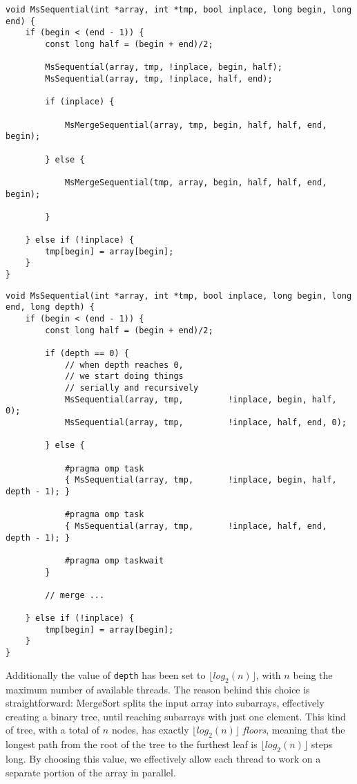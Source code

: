 \documentclass[11pt,a4paper,oneside]{book}
\begin{document}
	\begin{minipage}[t]{0.45\textwidth}
		\begin{lstlisting}[caption={Original version of MergeSort.},label=mergesort-original]
void MsSequential(int *array, int *tmp, bool inplace, long begin, long end) {
	if (begin < (end - 1)) {
		const long half = (begin + end)/2;
		
		MsSequential(array, tmp, !inplace, begin, half);
		MsSequential(array, tmp, !inplace, half, end);
		
		if (inplace) {
			
			MsMergeSequential(array, tmp, begin, half, half, end, begin);
			
		} else {
		
			MsMergeSequential(tmp, array, begin, half, half, end, begin);
			
		}
		
	} else if (!inplace) {
		tmp[begin] = array[begin];
	}
}
		\end{lstlisting}
	\end{minipage}%
	\hfill%
	\begin{minipage}[t]{0.45\textwidth}
		\begin{lstlisting}[caption={MergeSort implementation parallelized with OpenMP tasks.},label=mergesort-new]
void MsSequential(int *array, int *tmp, bool inplace, long begin, long end, long depth) {
	if (begin < (end - 1)) {
		const long half = (begin + end)/2;
		
		if (depth == 0) {
			// when depth reaches 0,
			// we start doing things
			// serially and recursively
			MsSequential(array, tmp,         !inplace, begin, half, 0);
			MsSequential(array, tmp,         !inplace, half, end, 0);
			
		} else {
		
			#pragma omp task
			{ MsSequential(array, tmp,       !inplace, begin, half, depth - 1); }
			
			#pragma omp task
			{ MsSequential(array, tmp,       !inplace, half, end, depth - 1); }
			
			#pragma omp taskwait
		}
		
		// merge ...
		
	} else if (!inplace) {
		tmp[begin] = array[begin];
	}
}
		\end{lstlisting}
	\end{minipage}
	
	Additionally the value of \verb|depth| has been set to $\lfloor log_2(n)\rfloor$, with $n$ being the maximum number of available threads. The reason behind this choice is straightforward: MergeSort splits the input array into subarrays, effectively creating a binary tree, until reaching subarrays with just one element. This kind of tree, with a total of $n$ nodes, has exactly $\lfloor log_2(n)\rfloor$ \textit{floors}, meaning that the longest path from the root of the tree to the furthest leaf is $\lfloor log_2(n)\rfloor$ steps long. By choosing this value, we effectively allow each thread to work on a separate portion of the array in parallel.
	
\end{document}
